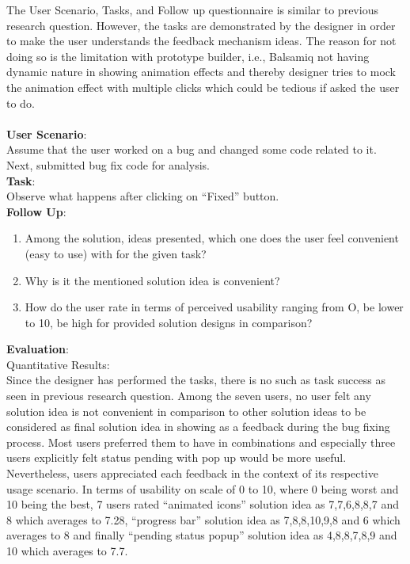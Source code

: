 The User Scenario, Tasks, and Follow up questionnaire is similar to previous research question. However, the tasks are demonstrated by the designer in order to make the user understands the feedback mechanism ideas. The reason for not doing so is the limitation with prototype builder, i.e., Balsamiq not having dynamic nature in showing animation effects and thereby designer tries to mock the animation effect with multiple clicks which could be tedious if asked the user to do. \\ \\

\textbf{User Scenario}: \\

Assume that the user worked on a bug and changed some code related to it. Next, submitted bug fix code for analysis. \\

\textbf{Task}: \\

Observe what happens after clicking on “Fixed” button. \\

\textbf{Follow Up}: \\

\begin{enumerate}
\item Among the solution, ideas presented, which one does the user feel convenient (easy to use) with for the given task?
\item Why is it the mentioned solution idea is convenient?
\item How do the user rate in terms of perceived usability ranging from O, be lower to 10, be high for provided solution designs in comparison?
\end{enumerate}

\textbf{Evaluation}: \\

Quantitative Results: \\

Since the designer has performed the tasks, there is no such as task success as seen in previous research question. Among the seven users, no user felt any solution idea is not convenient in comparison to other solution ideas to be considered as final solution idea in showing as a feedback during the bug fixing process.  Most users preferred them to have in combinations and especially three users explicitly felt status pending with pop up would be more useful. Nevertheless, users appreciated each feedback in the context of its respective usage scenario. In terms of usability on scale of 0 to 10, where 0 being worst and 10 being the best, 7 users rated “animated icons” solution idea as 7,7,6,8,8,7 and 8 which averages to 7.28, “progress bar” solution idea as 7,8,8,10,9,8 and 6 which averages to 8 and finally “pending status popup” solution idea as 4,8,8,7,8,9 and 10 which averages to 7.7. \\

